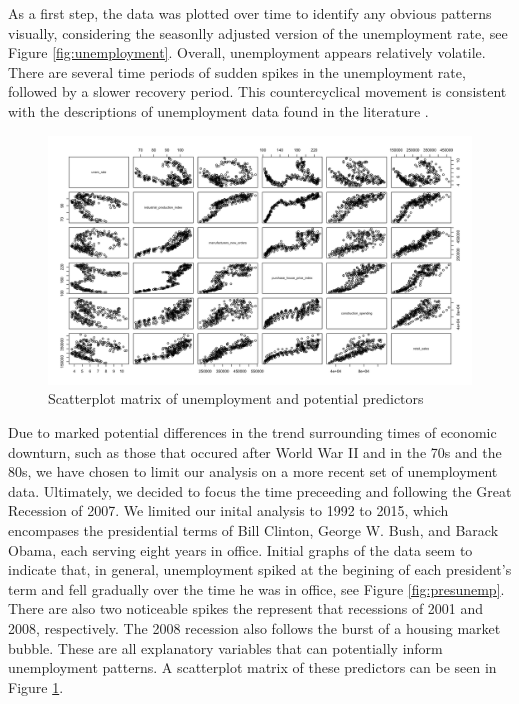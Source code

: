 \documentclass[twoside,twocolumn]{article}
\begin{document}
As a first step, the data was plotted over time to identify any obvious patterns visually, considering the seasonlly adjusted version of the unemployment rate, see Figure \ref{fig:unemployment}.  Overall, unemployment appears relatively volatile.  There are several time periods of sudden spikes in the unemployment rate, followed by a slower recovery period. This countercyclical movement is consistent with the descriptions of unemployment data found in the literature \citep{katz2010, Montgomery1998, shimer2012reassessing}. 
	
		\begin{figure}[htb]
		\caption{Scatterplot matrix of unemployment and potential predictors}
		\label{fig:pred_scatt}
		\includegraphics[width=\linewidth]{images/pred_scatt}
	\end{figure}

Due to marked potential differences in the trend surrounding times of economic downturn, such as those that occured after World War II and in the 70s and the 80s, we have chosen to limit our analysis on a more recent set of unemployment data. Ultimately, we decided to focus the time preceeding and following the Great Recession of 2007. We limited our inital analysis to 1992 to 2015, which encompases the presidential terms of Bill Clinton, George W. Bush, and Barack Obama, each serving eight years in office.  Initial graphs of the data seem to indicate that, in general, unemployment spiked at the begining of each president's term and fell gradually over the time he was in office, see Figure \ref{fig:presunemp}. There are also two noticeable spikes the represent that recessions of 2001 and 2008, respectively.  The 2008 recession also follows the burst of a housing market bubble.  These are all explanatory variables that can potentially inform unemployment patterns. A scatterplot matrix  of these predictors can be seen in Figure \ref{fig:pred_scatt}.
\end{document}

